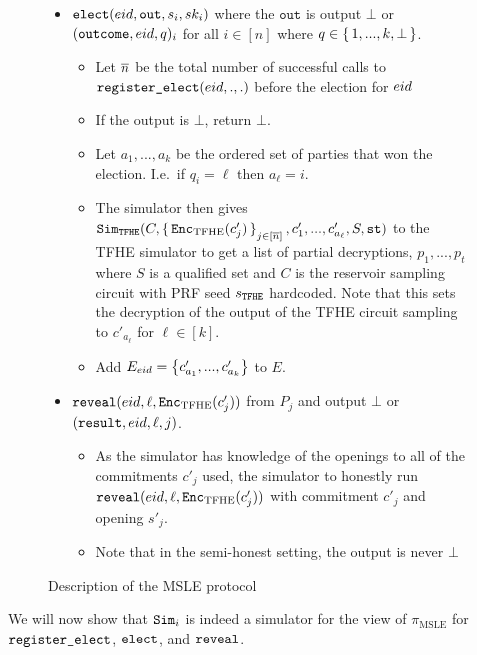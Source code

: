 \begin{figure}
{\begin{minipage}{1\textwidth}
\begin{itemize}

				\item $\texttt{elect}({eid}, \texttt{out}, s_i, sk_i)$ where the $\texttt{out}$ is output $\bot$ or $(\texttt{outcome}, {eid}, q)_i$ for all $i \in [n]$ where $q \in \set{1, ..., k, \bot}$.
				      \begin{itemize}
								\item Let $\overline{n}$ be the total number of successful calls to $\texttt{register\_elect}({eid}, ., .)$ before the election for ${eid}$
					      \item If the output is $\bot$, return $\bot$.
					      \item Let $a_1, ..., a_k$ be the ordered set of parties that won the election. I.e.\ if $q_i = \ell$ then $a_\ell = i$.
								\item The simulator then gives $\texttt{Sim}_{{\texttt{TFHE}}}(C, \set{\texttt{Enc}_{\mathrm{TFHE}}(c'_j)}_{j \in [\overline{n}]}, c'_1, ..., c'_{a_\ell}, S, \texttt{st})$
	to the TFHE simulator to get a list of partial decryptions, $p_1, ..., p_{t}$ where $S$ is a qualified set %
	and $C$ is the reservoir sampling circuit with PRF seed $s_{\texttt{TFHE}}$ hardcoded.
	Note that this sets the decryption of the output of the TFHE circuit sampling to $c'_{a_\ell}$ for $\ell \in [k]$.
					      \item Add $E_{eid} = \left\{c'_{a_1}, ..., c'_{a_k}\right\}$ to $E$.
				      \end{itemize}
				\item $\texttt{reveal}({eid}, \ell, \texttt{Enc}_{\mathrm{TFHE}}(c'_j))$ from $P_j$ and output $\bot$ or $(\texttt{result}, {eid}, \ell, j)$.
				      \begin{itemize}
					      \item As the simulator has knowledge of the openings to all of the commitments $c'_j$ used, the simulator
								to honestly run $\texttt{reveal}({eid}, \ell, \texttt{Enc}_{\mathrm{TFHE}}(c'_j))$ with commitment $c'_j$ and opening $s'_j$.
								\item Note that in the semi-honest setting, the output is never $\bot$
				      \end{itemize}
			\end{itemize}
		\end{minipage}
	}
	\caption{Description of the MSLE protocol}
	\label{fig:protocolMSLE}
\end{figure}

We will now show that $\texttt{Sim}_i$ is indeed a simulator for the view of $\pi_{\text{MSLE}}$
for $\texttt{register\_elect}$, $\texttt{elect}$, and $\texttt{reveal}$.

